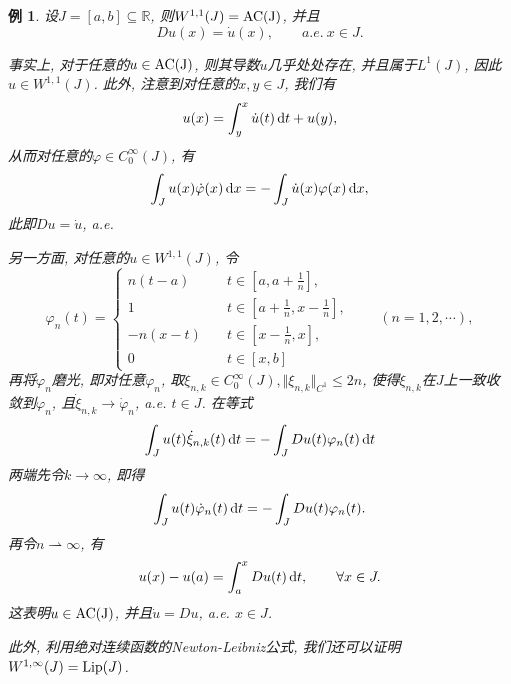 \documentclass[12pt,a4paper]{article}
\newtheorem{example}[theorem]{例}
\begin{document}
\begin{example}
    设$J = [a, b] \subseteq \mathbb{R}$, 则$W^{1, 1}(J) = {\rm AC(J)}$, 并且
    \begin{equation*}
        Du(x) = \dot u(x), \qquad a.e. \ x \in J.
    \end{equation*}

    事实上, 对于任意的$u \in {\rm AC(J)}$, 则其导数$\dot u$几乎处处存在, 并且属于$L^1(J)$, 因此$u \in W^{1, 1}(J)$.
    此外, 注意到对任意的$x, y \in J$, 我们有 
    \begin{equation*}
        u(x) = \int_y^x\dot u(t) \,{\rm d}t + u(y),
    \end{equation*}
    从而对任意的$\varphi \in C_0^{\infty}(J)$, 有
    \begin{equation*}
        \int_Ju(x)\dot \varphi(x) \,{\rm d}x = -\int_J\dot u(x)\varphi(x) \,{\rm d}x,
    \end{equation*}
    此即$Du = \dot u$, a.e.

    另一方面, 对任意的$u \in W^{1, 1}(J)$, 令 
    \begin{equation*}
        \varphi_n(t) = 
        \begin{cases}
            \displaystyle n(t - a) \quad &t \in \left[a, a + \frac{1}{n}\right], \\ 
            \displaystyle 1 \quad &t \in \left[a + \frac{1}{n}, x - \frac{1}{n}\right], \\ 
            \displaystyle -n(x - t) \quad &t \in \left[x - \frac{1}{n}, x\right], \\ 
            0 \quad &t \in [x, b]
        \end{cases}
        \qquad (n = 1, 2, \cdots),
    \end{equation*}
    再将$\varphi_n$磨光, 即对任意$\varphi_n$, 取$\xi_{n, k} \in C_0^{\infty}(J), \Vert \xi_{n, k} \Vert_{C^1} \leq 2n$, 使得$\xi_{n, k}$在$J$上一致收敛到$\varphi_n$, 且$\dot\xi_{n, k} \rightarrow \dot \varphi_n$, a.e. $t \in J$.
    在等式 
    \begin{equation*}
        \int_Ju(t)\dot\xi_{n, k}(t) \,{\rm d}t = -\int_JDu(t)\varphi_n(t) \,{\rm d}t
    \end{equation*}
    两端先令$k \rightarrow \infty$, 即得 
    \begin{equation*}
        \int_Ju(t)\dot\varphi_n(t) \,{\rm d}t = -\int_JDu(t)\varphi_n(t).
    \end{equation*}
    再令$n \rightharpoonup \infty$, 有 
    \begin{equation*}
        u(x) - u(a) = \int_a^xDu(t) \,{\rm d}t, \qquad \forall x \in J.
    \end{equation*}
    这表明$u \in {\rm AC(J)}$, 并且$\dot u = Du$, a.e. $x \in J$.

    此外, 利用绝对连续函数的Newton-Leibniz公式, 我们还可以证明$W^{1, \infty}(J) = {\rm Lip}(J)$.
\end{example}
\end{document}

